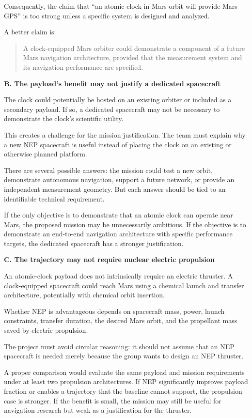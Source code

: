 Consequently, the claim that ``an atomic clock in Mars orbit will
provide Mars GPS'' is too strong unless a specific system is
designed and analyzed.

A better claim is:

\begin{quote}
	A clock-equipped Mars orbiter could demonstrate a component of
	a future Mars navigation architecture, provided that the
	measurement system and its navigation performance are specified.
\end{quote}

\textbf{B. The payload's benefit may not justify a dedicated
	spacecraft}

The clock could potentially be hosted on an existing orbiter or
included as a secondary payload. If so, a dedicated spacecraft
may not be necessary to demonstrate the clock's scientific
utility.

This creates a challenge for the mission justification. The team
must explain why a new NEP spacecraft is useful instead of placing
the clock on an existing or otherwise planned platform.

There are several possible answers: the mission could test a
new orbit, demonstrate autonomous navigation, support a future
network, or provide an independent measurement geometry. But each
answer should be tied to an identifiable technical requirement.

If the only objective is to demonstrate that an atomic clock
can operate near Mars, the proposed mission may be unnecessarily
ambitious. If the objective is to demonstrate an end-to-end
navigation architecture with specific performance targets, the
dedicated spacecraft has a stronger justification.

\textbf{C. The trajectory may not require nuclear electric
	propulsion}

An atomic-clock payload does not intrinsically require an electric
thruster. A clock-equipped spacecraft could reach Mars using a
chemical launch and transfer architecture, potentially with
chemical orbit insertion.

Whether NEP is advantageous depends on spacecraft mass, power,
launch constraints, transfer duration, the desired Mars orbit,
and the propellant mass saved by electric propulsion.

The project must avoid circular reasoning: it should not assume
that an NEP spacecraft is needed merely because the group wants
to design an NEP thruster.

A proper comparison would evaluate the same payload and mission
requirements under at least two propulsion architectures. If
NEP significantly improves payload fraction or enables a
trajectory that the baseline cannot support, the propulsion
case is stronger. If the benefit is small, the mission may still
be useful for navigation research but weak as a justification
for the thruster.

